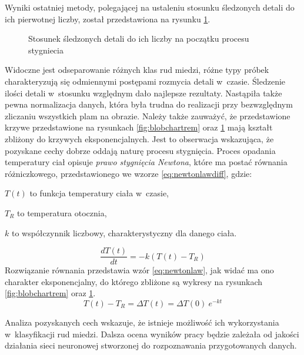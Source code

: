 Wyniki ostatniej metody, polegającej na ustaleniu stosunku śledzonych detali
do ich pierwotnej liczby, został przedstawiona na rysunku
\ref{fig:blobcharperc}.
\begin{figure}[htb]
    \centering
    
    \caption{Stosunek śledzonych detali do ich liczby na początku procesu
             stygniecia}
    \label{fig:blobcharperc}
\end{figure}
Widoczne jest odseparowanie różnych klas rud miedzi, różne typy próbek
charakteryzują się odmiennymi postępami rozmycia detali w~czasie.
Śledzenie ilości detali w~stosunku względnym dało najlepsze rezultaty.
Nastąpiła także pewna normalizacja danych, która była trudna do realizacji
przy bezwzględnym zliczaniu wszystkich plam na obrazie.
Należy także zauważyć, że przedstawione krzywe przedstawione na rysunkach
\ref{fig:blobchartrem} oraz \ref{fig:blobcharperc} mają kształt zbliżony
do krzywych eksponencjalnych.
Jest to obserwacja wskazująca, że pozyskane cechy dobrze oddają naturę procesu
stygnięcia.
Proces opadania temperatury ciał opisuje \emph{prawo stygnięcia Newtona},
które ma postać równania różniczkowego, przedstawionego we wzorze
\ref{eq:newtonlawdiff}, gdzie:
\begin{description}
	\item $ T \left( t \right) $ to funkcja temperatury ciała w~czasie,
	\item $ T_R $ to temperatura otocznia,
	\item $ k $ to współczynnik liczbowy, charakterystyczny dla danego ciała.
\end{description}

\begin{equation}
	\frac{dT \left( t \right)}{dt}=-k\left( T \left( t \right) -T_{R} \right)
\label{eq:newtonlawdiff}
\end{equation}
Rozwiązanie równania przedstawia wzór \ref{eq:newtonlaw}, jak widać ma ono
charakter eksponencjalny, do którego zbliżone są wykresy na rysunkach
\ref{fig:blobchartrem} oraz \ref{fig:blobcharperc}.
\begin{equation}
	T(t) - T_{R} = \Delta T (t) = \Delta T (0) \ e^ {-k t}
\label{eq:newtonlaw}
\end{equation}

Analiza pozyskanych cech wskazuje, że istnieje możliwość ich wykorzystania
w~klasyfikacji rud miedzi.
Dalsza ocena wyników pracy będzie zależała od jakości działania sieci
neuronowej stworzonej do rozpoznawania przygotowanych danych.
